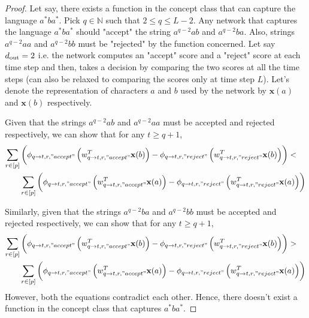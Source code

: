 \begin{proof}
	Let say, there exists a function in the concept class that can capture the language $a^{*}ba^{*}$.
	Pick $q \in \mathbb{N}$ such that $2 \le q \le L - 2$. Any network that captures the language $a^{*}ba^{*}$ should "accept" the string $a^{q-2}ab$ and $a^{q-2}ba$. Also,  
	strings $a^{q-2}aa$ and $a^{q-2}bb$ must be "rejected" by the function concerned. Let say $d_{\mathrm{out}}  = 2$ i.e. the network computes an "accept" score and a "reject"
	score at each time step and then, takes a decision by comparing the two scores at all the time steps (can also be relaxed to comparing the scores only at time step $L$).  Let's denote the representation of characters $a$ and $b$ used by the network by $\mathbf{x}(a)$ 
	and $\mathbf{x}(b)$ respectively. 
	
	Given that the strings $a^{q-2}ab$ and $a^{q-2}aa$ must be accepted and rejected respectively, we can show that for any $t \ge q + 1$,
	\begin{align*}
		\sum_{r \in [p]} &\left( \phi_{q \to t, r, "accept"} \left(w_{q \to t, r, "accept"}^T \mathbf{x}(b)\right) - \phi_{q \to t, r, "reject"} \left(w_{q \to t, r, "reject"}^T \mathbf{x}(b)\right)\right) < \\ & \sum_{r \in [p]} \left( \phi_{q \to t, r, "accept"} \left(w_{q \to t, r, "accept"}^T \mathbf{x}(a)\right) - \phi_{q \to t, r, "reject"} \left(w_{q \to t, r, "reject"}^T \mathbf{x}(a)\right)\right)
	\end{align*}
	
	Similarly, given that the strings $a^{q-2}ba$ and $a^{q-2}bb$ must be accepted and rejected respectively, we can show that for any $t \ge q + 1$,       
	\begin{align*}
		\sum_{r \in [p]} &\left( \phi_{q \to t, r, "accept"} \left(w_{q \to t, r, "accept"}^T \mathbf{x}(b)\right) - \phi_{q \to t, r, "reject"} \left(w_{q \to t, r, "reject"}^T \mathbf{x}(b)\right)\right) > \\ & \sum_{r \in [p]} \left( \phi_{q \to t, r, "accept"} \left(w_{q \to t, r, "accept"}^T \mathbf{x}(a)\right) - \phi_{q \to t, r, "reject"} \left(w_{q \to t, r, "reject"}^T \mathbf{x}(a)\right)\right)
	\end{align*}
	However, both the equations contradict each other. Hence, there doesn't exist a function in the concept class that captures $a^{*}ba^{*}$.
\end{proof}
\fi
